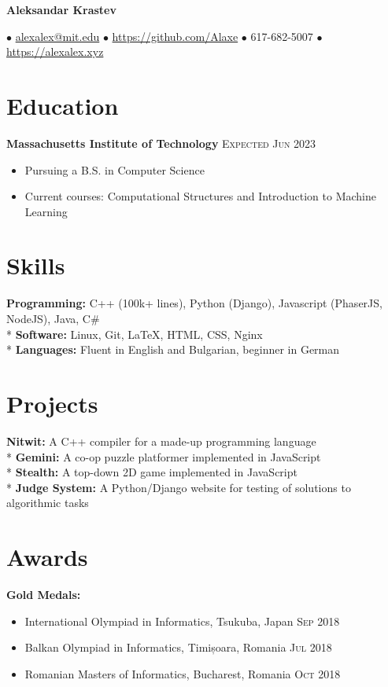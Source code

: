 \documentclass[letterpaper,11pt]{article}
\author{Aleksandar Krastev}
\date{2019-09-03}
\newcommand{\noskip}{\vspace{-\parskip}}
\begin{document}
\centerline{{\Huge \bf Aleksandar Krastev}}
$\bullet$ \href{mailto:alexalex@mit.edu}{alexalex@mit.edu} \hfill
$\bullet$ \href{https://github.com/Alaxe}{https://github.com/Alaxe} \hfill
$\bullet$ 617-682-5007 \hfill
$\bullet$ \href{https://alexalex.xyz}{https://alexalex.xyz}

\noskip
\section*{Education}
\textbf{Massachusetts Institute of Technology}
\hfill
\textsc{Expected Jun 2023}

\noskip
\begin{itemize}
    \item Pursuing a B.S. in Computer Science
    \item Current courses: Computational Structures and Introduction to Machine
        Learning
\end{itemize}

\section*{Skills}
\textbf{Programming:} C++ (100k+ lines), Python (Django), Javascript
    (PhaserJS, NodeJS), Java, C\#\\*
\textbf{Software:} Linux, Git, LaTeX, HTML, CSS, Nginx\\*
\textbf{Languages:} Fluent in English and Bulgarian, beginner in German

\section*{Projects}
\textbf{Nitwit:} A C++ compiler for a made-up programming language\\*
\textbf{Gemini:} A co-op puzzle platformer implemented in JavaScript\\*
\textbf{Stealth:} A top-down 2D game implemented in JavaScript\\*
\textbf{Judge System:} A Python/Django website for testing of solutions
to algorithmic tasks

\section*{Awards}
\textbf{Gold Medals:}
\noskip
\begin{itemize}
    \item International Olympiad in Informatics, Tsukuba, Japan
        \hfill \textsc{Sep 2018}
    \item Balkan Olympiad in Informatics, Timișoara, Romania
        \hfill \textsc{Jul 2018}
    \item Romanian Masters of Informatics, Bucharest, Romania
        \hfill \textsc{Oct 2018}
\end{itemize}
\end{document}
